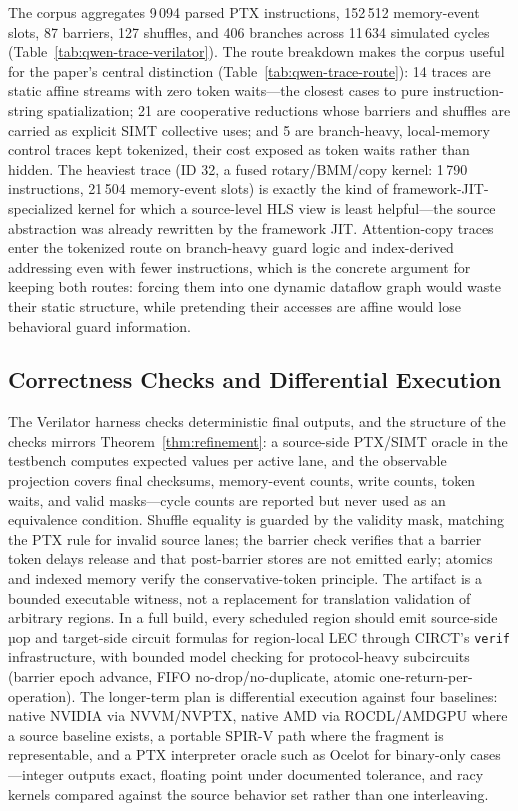 \documentclass[sigplan,nonacm]{acmart}
\begin{document}
The corpus aggregates 9\,094 parsed PTX instructions, 152\,512 memory-event
slots, 87 barriers, 127 shuffles, and 406 branches across 11\,634 simulated
cycles (Table~\ref{tab:qwen-trace-verilator}).  The route breakdown makes
the corpus useful for the paper's central distinction
(Table~\ref{tab:qwen-trace-route}): 14 traces are static affine streams
with zero token waits---the closest cases to pure instruction-string
spatialization; 21 are cooperative reductions whose barriers and shuffles
are carried as explicit SIMT collective uses; and 5 are branch-heavy,
local-memory control traces kept tokenized, their cost exposed as token
waits rather than hidden.  The heaviest trace (ID 32, a fused
rotary/BMM/copy kernel: 1\,790 instructions, 21\,504 memory-event slots) is
exactly the kind of framework-JIT-specialized kernel for which a
source-level HLS view is least helpful---the source abstraction was already
rewritten by the framework JIT.  Attention-copy traces enter the tokenized
route on branch-heavy guard logic and index-derived addressing even with
fewer instructions, which is the concrete argument for keeping both routes:
forcing them into one dynamic dataflow graph would waste their static
structure, while pretending their accesses are affine would lose behavioral
guard information.

\subsection{Correctness Checks and Differential Execution}
\label{sec:eval-correctness}

The Verilator harness checks deterministic final outputs, and the structure
of the checks mirrors Theorem~\ref{thm:refinement}: a source-side PTX/SIMT
oracle in the testbench computes expected values per active lane, and the
observable projection covers final checksums, memory-event counts, write
counts, token waits, and valid masks---cycle counts are reported but never
used as an equivalence condition.  Shuffle equality is guarded by the
validity mask, matching the PTX rule for invalid source lanes; the barrier
check verifies that a barrier token delays release and that post-barrier
stores are not emitted early; atomics and indexed memory verify the
conservative-token principle.  The artifact is a bounded executable witness,
not a replacement for translation validation of arbitrary regions.  In a
full build, every scheduled region should emit source-side µop and
target-side circuit formulas for region-local LEC through CIRCT's
\texttt{verif} infrastructure, with bounded model checking for
protocol-heavy subcircuits (barrier epoch advance, FIFO no-drop/no-duplicate,
atomic one-return-per-operation).  The longer-term plan is differential
execution against four baselines: native NVIDIA via NVVM/NVPTX, native AMD
via ROCDL/AMDGPU where a source baseline exists, a portable SPIR-V path
where the fragment is representable, and a PTX interpreter oracle such as
Ocelot for binary-only cases---integer outputs exact, floating point under
documented tolerance, and racy kernels compared against the source behavior
set rather than one interleaving.
\end{document}
